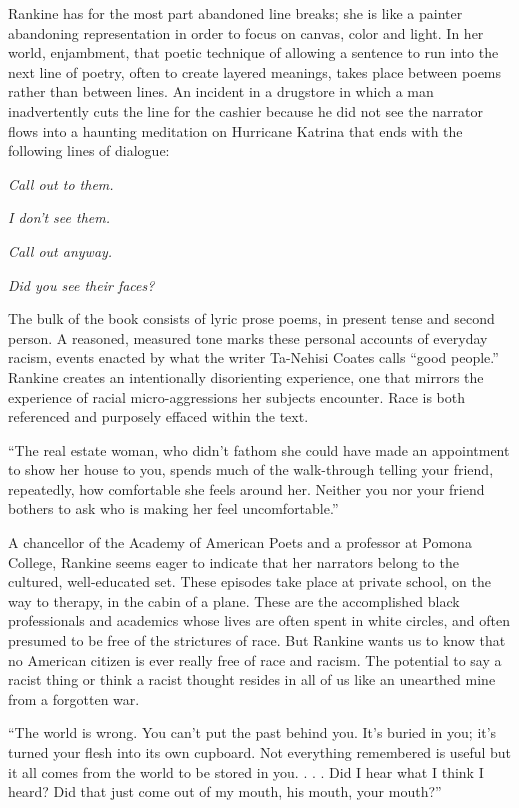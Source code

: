 Rankine has for the most part abandoned line breaks; she is like a
painter abandoning representation in order to focus on canvas, color and
light. In her world, enjambment, that poetic technique of allowing a
sentence to run into the next line of poetry, often to create layered
meanings, takes place between poems rather than between lines. An
incident in a drugstore in which a man inadvertently cuts the line for
the cashier because he did not see the narrator flows into a haunting
meditation on Hurricane Katrina that ends with the following lines of
dialogue:

\emph{Call out to them.}

\emph{I don't see them.}

\emph{Call out anyway.}

\emph{Did you see their faces?}

The bulk of the book consists of lyric prose poems, in present tense and
second person. A reasoned, measured tone marks these personal accounts
of everyday racism, events enacted by what the writer Ta-Nehisi Coates
calls ``good people.'' Rankine creates an intentionally disorienting
experience, one that mirrors the experience of racial micro-aggressions
her subjects encounter. Race is both referenced and purposely effaced
within the text.

``The real estate woman, who didn't fathom she could have made an
appointment to show her house to you, spends much of the walk-through
telling your friend, repeatedly, how comfortable she feels around her.
Neither you nor your friend bothers to ask who is making her feel
uncomfortable.''

A chancellor of the Academy of American Poets and a professor at Pomona
College, Rankine seems eager to indicate that her narrators belong to
the cultured, well-­educated set. These episodes take place at private
school, on the way to therapy, in the cabin of a plane. These are the
accomplished black professionals and academics whose lives are often
spent in white circles, and often presumed to be free of the strictures
of race. But Rankine wants us to know that no American citizen is ever
really free of race and racism. The potential to say a racist thing or
think a racist thought resides in all of us like an unearthed mine from
a forgotten war.

``The world is wrong. You can't put the past behind you. It's buried in
you; it's turned your flesh into its own cupboard. Not everything
remembered is useful but it all comes from the world to be stored in
you. . . . Did I hear what I think I heard? Did that just come out of my
mouth, his mouth, your mouth?''

